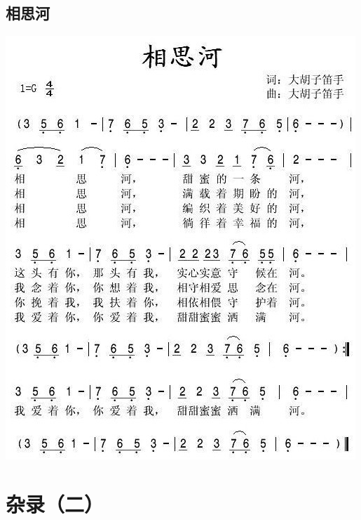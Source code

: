 \documentclass[cn,pad,twocol]{elegantbook}
\begin{document}
\section{相思河}    \includegraphics[width=\textwidth]{dongxiao/20200901-相思河.jpeg}
\chapter{杂录（二）}
\end{document}
